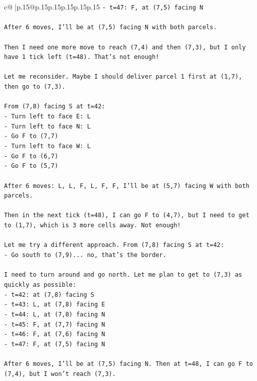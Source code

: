 \documentclass{article}
\begin{document}
{\begin{supertabular}{c@{$\;$}|p{.15\linewidth}@{}p{.15\linewidth}p{.15\linewidth}p{.15\linewidth}p{.15\linewidth}p{.15\linewidth}}
{{{\texttt{{-} t=47: F, at (7,5) facing N} \\
\\ 
\texttt{After 6 moves, I'll be at (7,5) facing N with both parcels.} \\
\\ 
\texttt{Then I need one more move to reach (7,4) and then (7,3), but I only have 1 tick left (t=48). That's not enough!} \\
\\ 
\texttt{Let me reconsider. Maybe I should deliver parcel 1 first at (1,7), then go to (7,3).} \\
\\ 
\texttt{From (7,8) facing S at t=42:} \\
\texttt{{-} Turn left to face E: L} \\
\texttt{{-} Turn left to face N: L} \\
\texttt{{-} Go F to (7,7)} \\
\texttt{{-} Turn left to face W: L} \\
\texttt{{-} Go F to (6,7)} \\
\texttt{{-} Go F to (5,7)} \\
\\ 
\texttt{After 6 moves: L, L, F, L, F, F, I'll be at (5,7) facing W with both parcels.} \\
\\ 
\texttt{Then in the next tick (t=48), I can go F to (4,7), but I need to get to (1,7), which is 3 more cells away. Not enough!} \\
\\ 
\texttt{Let me try a different approach. From (7,8) facing S at t=42:} \\
\texttt{{-} Go south to (7,9)... no, that's the border.} \\
\\ 
\texttt{I need to turn around and go north. Let me plan to get to (7,3) as quickly as possible:} \\
\texttt{{-} t=42: at (7,8) facing S} \\
\texttt{{-} t=43: L, at (7,8) facing E} \\
\texttt{{-} t=44: L, at (7,8) facing N} \\
\texttt{{-} t=45: F, at (7,7) facing N} \\
\texttt{{-} t=46: F, at (7,6) facing N} \\
\texttt{{-} t=47: F, at (7,5) facing N} \\
\\ 
\texttt{After 6 moves, I'll be at (7,5) facing N. Then at t=48, I can go F to (7,4), but I won't reach (7,3).} \\
}}}
\end{supertabular}}
\end{document}
